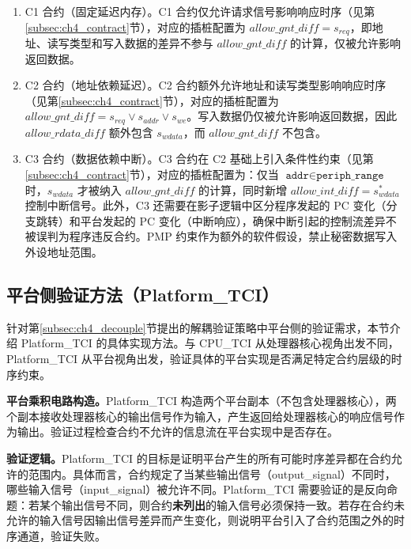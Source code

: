 \begin{enumerate}
    \item C1 合约（固定延迟内存）。C1 合约仅允许请求信号影响响应时序（见第\ref{subsec:ch4_contract}节），对应的插桩配置为 $\textit{allow\_gnt\_diff} = s_{\textit{req}}$，即地址、读写类型和写入数据的差异不参与 $\textit{allow\_gnt\_diff}$ 的计算，仅被允许影响返回数据。
    \item C2 合约（地址依赖延迟）。C2 合约额外允许地址和读写类型影响响应时序（见第\ref{subsec:ch4_contract}节），对应的插桩配置为 $\textit{allow\_gnt\_diff} = s_{\textit{req}} \vee s_{\textit{addr}} \vee s_{\textit{we}}$。写入数据仍仅被允许影响返回数据，因此 $\textit{allow\_rdata\_diff}$ 额外包含 $s_{\textit{wdata}}$，而 $\textit{allow\_gnt\_diff}$ 不包含。
    \item C3 合约（数据依赖中断）。C3 合约在 C2 基础上引入条件性约束（见第\ref{subsec:ch4_contract}节），对应的插桩配置为：仅当 $\texttt{addr} \in \texttt{periph\_range}$ 时，$s_{\textit{wdata}}$ 才被纳入 $\textit{allow\_gnt\_diff}$ 的计算，同时新增 $\textit{allow\_int\_diff} = s_{\textit{wdata}}^{*}$ 控制中断信号。此外，C3 还需要在影子逻辑中区分程序发起的 PC 变化（分支跳转）和平台发起的 PC 变化（中断响应），确保中断引起的控制流差异不被误判为程序违反合约。PMP 约束作为额外的软件假设，禁止秘密数据写入外设地址范围。
\end{enumerate}

\subsection{平台侧验证方法（Platform\_TCI）}
\label{subsec:ch4_plat_tci}

针对第\ref{subsec:ch4_decouple}节提出的解耦验证策略中平台侧的验证需求，本节介绍 Platform\_TCI 的具体实现方法。与 CPU\_TCI 从处理器核心视角出发不同，Platform\_TCI 从平台视角出发，验证具体的平台实现是否满足特定合约层级的时序约束。

\textbf{平台乘积电路构造。}Platform\_TCI 构造两个平台副本（不包含处理器核心），两个副本接收处理器核心的输出信号作为输入，产生返回给处理器核心的响应信号作为输出。验证过程检查合约不允许的信息流在平台实现中是否存在。

\textbf{验证逻辑。}Platform\_TCI 的目标是证明平台产生的所有可能时序差异都在合约允许的范围内。具体而言，合约规定了当某些输出信号（output\_signal）不同时，哪些输入信号（input\_signal）被允许不同。Platform\_TCI 需要验证的是反向命题：若某个输出信号不同，则合约\textbf{未列出}的输入信号必须保持一致。若存在合约未允许的输入信号因输出信号差异而产生变化，则说明平台引入了合约范围之外的时序通道，验证失败。


